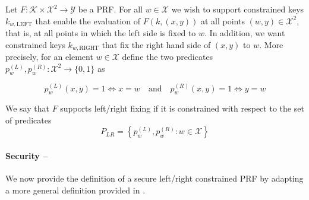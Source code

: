 \begin{definition}
	Let $F: \mathcal{K} \times \mathcal{X}^2 \rightarrow \mathcal{Y}$ be a PRF. For all $w \in \mathcal{X}$ we wish to support constrained keys $k_{w, \mathrm{LEFT}}$ that enable the evaluation of $F(k, (x,y))$ at all points $(w,y)\in \mathcal{X}^2$, that is, at all points in which the left side is fixed to $w$. In addition, we want constrained keys $k_{w,\mathrm{RIGHT}}$ that fix the right hand side of $(x,y)$ to $w$. More precisely, for an element $w \in \mathcal{X}$ define the two predicates $p_w^{(L)}, p_w^{(R)}: \mathcal{X}^2 \rightarrow \{0,1\}$ as
	
	$$
		p_w^{(L)}(x,y) = 1 \iff x = w \quad \mathrm{and} \quad p_w^{(R)}(x,y) = 1 \iff y = w 
	$$
	
	We say that $F$ supports left/right fixing if it is constrained with respect to the set of predicates
	$$
		P_{LR}=\left\{ p_w^{(L)}, p_w^{(R)}: w\in \mathcal{X} \right\}
	$$
	
\end{definition}

\paragraph{Security -- } We now provide the definition of a secure left/right constrained PRF by adapting a more general definition provided in \cite{LRPRF}.

